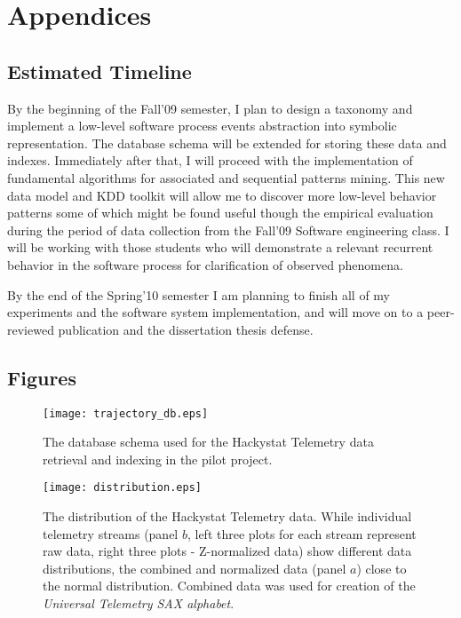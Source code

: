 \chapter{Appendices} \label{appendix}

\section{Estimated Timeline}
By the beginning of the Fall'09 semester, I plan to design a taxonomy and implement a low-level software process events abstraction into symbolic representation. The database schema will be extended for storing these data and indexes. Immediately after that, I will proceed with the implementation of fundamental algorithms for associated and sequential patterns mining. This new data model and KDD toolkit will allow me to discover more low-level behavior patterns some of which might be found useful though the empirical evaluation during the period of data collection from the Fall'09 Software engineering class. I will be working with those students who will demonstrate a relevant recurrent behavior in the software process for clarification of observed phenomena.

By the end of the Spring'10 semester I am planning to finish all of my experiments and the software system implementation, and will move on to a peer-reviewed publication and the dissertation thesis defense.

\section{Figures}
\begin{figure}[tbp]
   \centering
   \texttt{[image: trajectory\_db.eps]}
   \caption{The database schema used for the Hackystat Telemetry data retrieval and indexing in the pilot project.}
   \label{fig:trajectory_db}
\end{figure}

\begin{figure}[tbp]
   \centering
   \texttt{[image: distribution.eps]}
   \caption{The distribution of the Hackystat Telemetry data. While individual telemetry streams (panel $b$, left three plots for each stream represent raw data, right three plots - Z-normalized data) show different data distributions, the combined and normalized data (panel $a$) close to the normal distribution. Combined data was used for creation of the \textit{Universal Telemetry SAX alphabet}.}
   \label{fig:distribution}
\end{figure}


